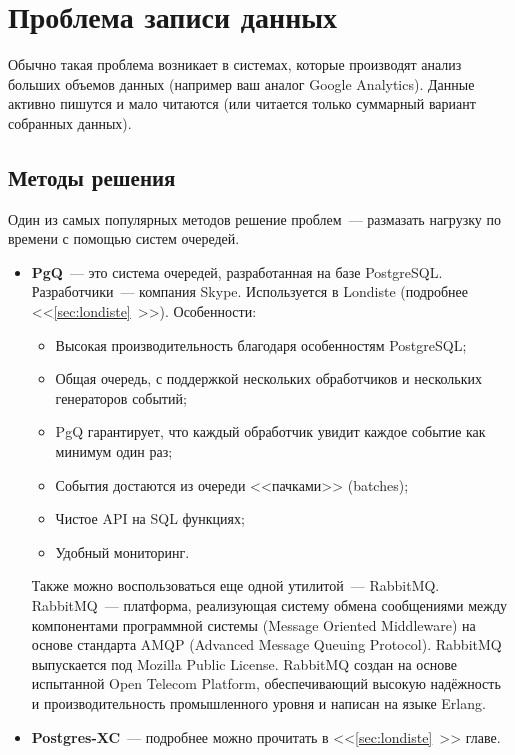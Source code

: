 \section{Проблема записи данных}

Обычно такая проблема возникает в системах, которые производят анализ больших объемов данных (например ваш аналог Google Analytics). Данные активно пишутся и мало читаются (или читается только суммарный вариант собранных данных).

\subsection{Методы решения}

Один из самых популярных методов решение проблем~--- размазать нагрузку по времени с помощью систем очередей.

\begin{itemize}
  \item \textbf{PgQ}~--- это система очередей, разработанная на базе PostgreSQL. Разработчики~--- компания Skype. Используется в Londiste (подробнее <<\ref{sec:londiste}~>>). Особенности:
  \begin{itemize}
    \item Высокая производительность благодаря особенностям PostgreSQL;
    \item Общая очередь, с поддержкой нескольких обработчиков и нескольких генераторов событий;
    \item PgQ гарантирует, что каждый обработчик увидит каждое событие как минимум один раз;
    \item События достаются из очереди <<пачками>> (batches);
    \item Чистое API на SQL функциях;
    \item Удобный мониторинг.
  \end{itemize}

  Также можно воспользоваться еще одной утилитой~--- RabbitMQ. RabbitMQ~--- платформа, реализующая систему обмена сообщениями между компонентами программной системы (Message Oriented Middleware) на основе стандарта AMQP (Advanced Message Queuing Protocol). RabbitMQ выпускается под Mozilla Public License. RabbitMQ создан на основе испытанной Open Telecom Platform, обеспечивающий высокую надёжность и производительность промышленного уровня и написан на языке Erlang.

  \item \textbf{Postgres-XC}~--- подробнее можно прочитать в <<\ref{sec:londiste}~>> главе.
\end{itemize}